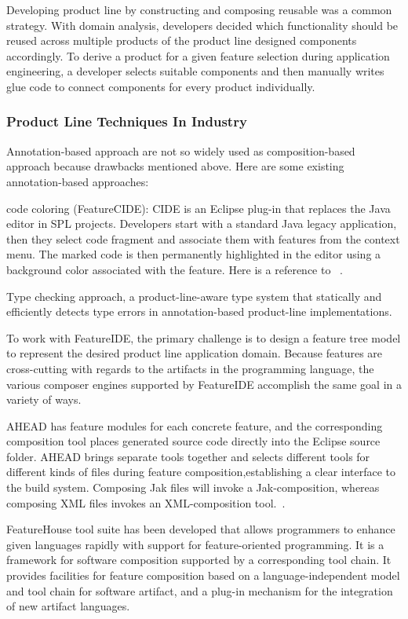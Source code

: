 Developing product line by constructing and composing reusable was a common strategy. With domain analysis,
developers decided which functionality should be reused across multiple products of the product line designed
components accordingly. To derive a product for a given feature selection during application engineering, a
developer selects suitable components and then manually writes glue code to connect components for every
product individually.




\subsubsection{Product Line Techniques In Industry}

Annotation-based approach are not so widely used as composition-based approach because drawbacks mentioned above.
Here are some existing annotation-based approaches:

code coloring (FeatureCIDE): CIDE is an Eclipse plug-in that replaces the Java editor in SPL projects. Developers
start with a standard Java legacy application, then they select code fragment and associate them with features
 from the context menu. The marked code is then permanently highlighted in the editor using a background color
 associated with the feature. Here is a reference to ~\cite{CIDE:Eclipse}.


Type checking approach,  a product-line-aware type system that statically and efficiently detects type errors in
annotation-based product-line implementations.~\cite{Kastner:2012}


To work with FeatureIDE, the primary challenge is to design a feature tree model to represent the desired product
line application domain. Because features are cross-cutting with regards to the artifacts in the programming
language, the various composer engines supported by FeatureIDE accomplish the same goal in a variety of ways.

AHEAD has feature modules for each concrete feature, and the corresponding composition tool places generated
source code directly into the Eclipse source folder. AHEAD brings separate tools together and selects different
tools for different kinds of files during feature composition,establishing a clear interface to the build
system. Composing Jak files will invoke a Jak-composition, whereas composing XML files invokes an
XML-composition tool.~\cite{Batory2004FeatureorientedPA}.

FeatureHouse tool suite has been developed that allows programmers to enhance given languages rapidly with
support for feature-oriented programming. It is a framework for software composition supported by a
corresponding tool chain. It provides facilities for feature  composition based on a language-independent
model and tool chain for software artifact, and a plug-in mechanism for the integration of new artifact
languages.~\cite{Apel:2009:FLA:1555001.1555038}

